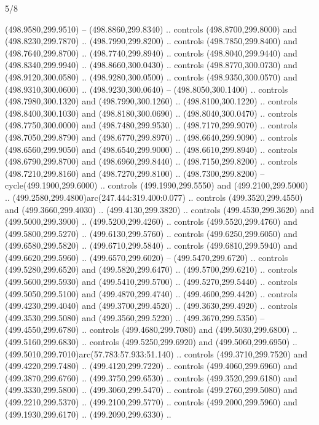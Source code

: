 \begin{flagdescription}{5/8}
\begin{scope}[xshift=0.5\flaglength,yshift=0.5\flagwidth,scale=\flagwidth/475.63]
\begin{scope}[y=0.8pt, x=0.8pt, yscale=-1, xscale=1,shift={(-450,-300)}]
\begin{scope}[cm={{1.0,0.0,0.0,1.0,(-0.0002,0.12556)}},cm={{1.0,0.0,0.0,1.0,(0.00179,0.0)}}]
\begin{scope}[cm={{1.11592,0.0,0.0,1.11592,(-106.89933,-41.77764)}}]
\begin{scope}[draw=black,fill=cfff]
\begin{scope}[fill=black]
  (498.9580,299.9510) -- (498.8860,299.8340) .. controls (498.8700,299.8000) and
  (498.8230,299.7870) .. (498.7990,299.8200) .. controls (498.7850,299.8400) and
  (498.7640,299.8700) .. (498.7740,299.8940) .. controls (498.8040,299.9440) and
  (498.8340,299.9940) .. (498.8660,300.0430) .. controls (498.8770,300.0730) and
  (498.9120,300.0580) .. (498.9280,300.0500) .. controls (498.9350,300.0570) and
  (498.9310,300.0600) .. (498.9230,300.0640) -- (498.8050,300.1400) .. controls
  (498.7980,300.1320) and (498.7990,300.1260) .. (498.8100,300.1220) .. controls
  (498.8400,300.1030) and (498.8180,300.0690) .. (498.8040,300.0470) .. controls
  (498.7750,300.0000) and (498.7480,299.9530) .. (498.7170,299.9070) .. controls
  (498.7050,299.8790) and (498.6770,299.8970) .. (498.6640,299.9090) .. controls
  (498.6560,299.9050) and (498.6540,299.9000) .. (498.6610,299.8940) .. controls
  (498.6790,299.8700) and (498.6960,299.8440) .. (498.7150,299.8200) .. controls
  (498.7210,299.8160) and (498.7270,299.8100) .. (498.7300,299.8200) --
  cycle(499.1900,299.6000) .. controls (499.1990,299.5550) and
  (499.2100,299.5000) .. (499.2580,299.4800)arc(247.444:319.400:0.077) ..
  controls (499.3520,299.4550) and (499.3660,299.4030) .. (499.4130,299.3820) ..
  controls (499.4530,299.3620) and (499.5000,299.3900) .. (499.5200,299.4260) ..
  controls (499.5520,299.4760) and (499.5800,299.5270) .. (499.6130,299.5760) ..
  controls (499.6250,299.6050) and (499.6580,299.5820) .. (499.6710,299.5840) ..
  controls (499.6810,299.5940) and (499.6620,299.5960) .. (499.6570,299.6020) --
  (499.5470,299.6720) .. controls (499.5280,299.6520) and (499.5820,299.6470) ..
  (499.5700,299.6210) .. controls (499.5600,299.5930) and (499.5410,299.5700) ..
  (499.5270,299.5440) .. controls (499.5050,299.5100) and (499.4870,299.4740) ..
  (499.4600,299.4420) .. controls (499.4230,299.4040) and (499.3700,299.4520) ..
  (499.3630,299.4920) .. controls (499.3530,299.5080) and (499.3560,299.5220) ..
  (499.3670,299.5350) -- (499.4550,299.6780) .. controls (499.4680,299.7080) and
  (499.5030,299.6800) .. (499.5160,299.6830) .. controls (499.5250,299.6920) and
  (499.5060,299.6950) .. (499.5010,299.7010)arc(57.783:57.933:51.140) ..
  controls (499.3710,299.7520) and (499.4220,299.7480) .. (499.4120,299.7220) ..
  controls (499.4060,299.6960) and (499.3870,299.6760) .. (499.3750,299.6530) ..
  controls (499.3520,299.6180) and (499.3330,299.5800) .. (499.3060,299.5470) ..
  controls (499.2760,299.5080) and (499.2210,299.5370) .. (499.2100,299.5770) ..
  controls (499.2000,299.5960) and (499.1930,299.6170) .. (499.2090,299.6330) ..

\end{scope}
\end{scope}
\end{scope}
\end{scope}
\end{scope}
\end{scope}
\end{flagdescription}
